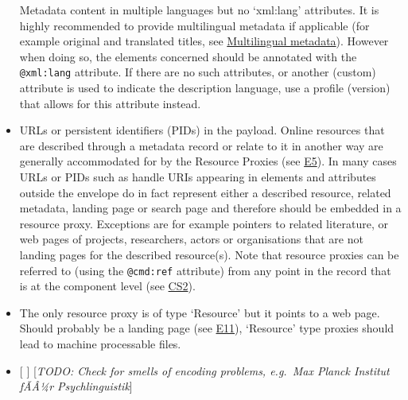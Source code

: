 \begin{itemize}
  Metadata content in multiple languages but no `xml:lang' attributes.
  It is highly recommended to provide multilingual metadata if
  applicable (for example original and translated titles, see
  \href{../common_approachesproblems/multilingual_metadata.md}{Multilingual
  metadata}). However when doing so, the elements concerned should be
  annotated with the \texttt{@xml:lang} attribute. If there are no such
  attributes, or another (custom) attribute is used to indicate the
  description language, use a profile (version) that allows for this
  attribute instead.
\item
  URLs or persistent identifiers (PIDs) in the payload. Online resources
  that are described through a metadata record or relate to it in
  another way are generally accommodated for by the Resource Proxies
  (see
  \href{/authoring_component_metadata_records/the_envelope.md\#e5}{E5}).
  In many cases URLs or PIDs such as handle URIs appearing in elements
  and attributes outside the envelope do in fact represent either a
  described resource, related metadata, landing page or search page and
  therefore should be embedded in a resource proxy. Exceptions are for
  example pointers to related literature, or web pages of projects,
  researchers, actors or organisations that are not landing pages for
  the described resource(s). Note that resource proxies can be referred
  to (using the \texttt{@cmd:ref} attribute) from any point in the
  record that is at the component level (see
  \href{/authoring_component_metadata_records/the_component_section.md\#cs2}{CS2}).
\item
  The only resource proxy is of type `Resource' but it points to a web
  page. Should probably be a landing page (see
  \href{/authoring_component_metadata_records/the_envelope.md\#e11}{E11}),
  `Resource' type proxies should lead to machine processable files.
\item
  {[} {]} {[}\emph{TODO: Check for smells of encoding problems, e.g.~Max
  Planck Institut fÃÂ¼r Psychlinguistik}{]}
\end{itemize}
